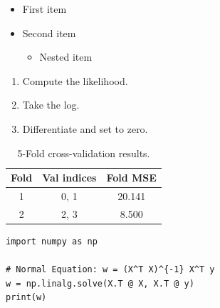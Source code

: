 \begin{itemize}
  \item First item
  \item Second item
    \begin{itemize}
      \item Nested item
    \end{itemize}
\end{itemize}

%
%

\begin{enumerate}
  \item Compute the likelihood.
  \item Take the log.
  \item Differentiate and set to zero.
\end{enumerate}

%
%

\begin{table}[htbp]
  \centering
  \caption{5-Fold cross-validation results.}
  \label{tab:cv-results}
  \begin{tabular}{ccc}
    \toprule
    Fold & Val indices & Fold MSE \\
    \midrule
    1 & 0, 1 & 20.141 \\
    2 & 2, 3 & 8.500  \\
    \bottomrule
  \end{tabular}
\end{table}

%
%

\begin{lstlisting}[style=python, caption={Normal Equation solution.}, label={lst:normal-eq}]
import numpy as np

# Normal Equation: w = (X^T X)^{-1} X^T y
w = np.linalg.solve(X.T @ X, X.T @ y)
print(w)
\end{lstlisting}

